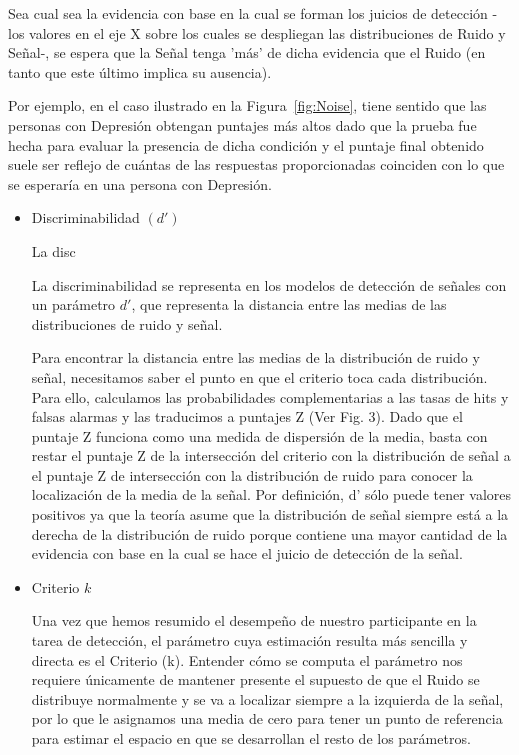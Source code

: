 Sea cual sea la evidencia con base en la cual se forman los juicios de detección -los valores en el eje X sobre los cuales se despliegan las distribuciones de Ruido y Señal-, se espera que la Señal tenga 'más' de dicha evidencia que el Ruido (en tanto que este último implica su ausencia). 


Por ejemplo, en el caso ilustrado en la Figura~\ref{fig:Noise}, tiene sentido que las personas con Depresión obtengan puntajes más altos dado que la prueba fue hecha para evaluar la presencia de dicha condición y el puntaje final obtenido suele ser reflejo de cuántas de las respuestas proporcionadas coinciden con lo que se esperaría en una persona con Depresión.\\

\begin{itemize}
\item Discriminabilidad $(d')$

La disc

La discriminabilidad se representa en los modelos de detección de señales con un parámetro $d'$, que representa la distancia entre las medias de las distribuciones de ruido y señal. 

Para encontrar la distancia entre las medias de la distribución de ruido y señal, necesitamos saber el punto en que el criterio toca cada distribución. Para ello, calculamos las probabilidades complementarias a las tasas de hits y falsas alarmas y las traducimos a puntajes Z (Ver Fig. 3). Dado que el puntaje Z funciona como una medida de dispersión de la media, basta con restar el puntaje Z de la intersección del criterio con la distribución de señal a el puntaje Z de intersección con la distribución de ruido para conocer la localización de la media de la señal. Por definición, d’ sólo puede tener valores positivos ya que la teoría asume que la distribución de señal siempre está a la derecha de la distribución de ruido porque contiene una mayor cantidad de la evidencia con base en la cual se hace el juicio de detección de la señal.



\item Criterio  $k$

Una vez que hemos resumido el desempeño de nuestro participante en la tarea de detección, el parámetro cuya estimación resulta más sencilla y directa es el Criterio (k). Entender cómo se computa el parámetro nos requiere únicamente de mantener presente el supuesto de que el Ruido se distribuye normalmente y se va a localizar siempre a la izquierda de la señal, por lo que le asignamos una media de cero para tener un punto de referencia para estimar el espacio en que se desarrollan el resto de los parámetros. \\


\end{itemize}

